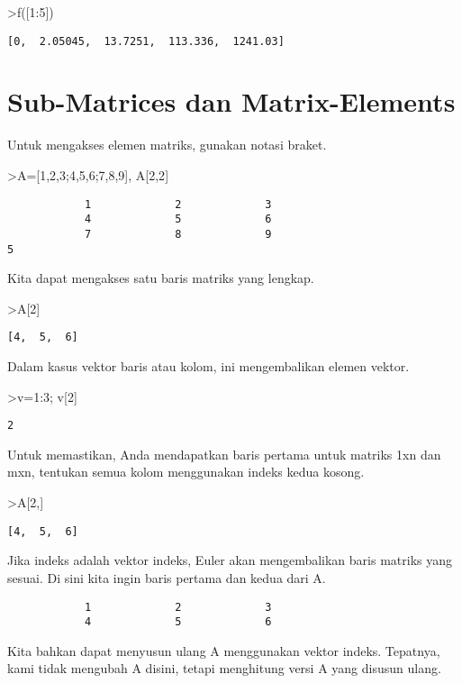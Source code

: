 \documentclass[
]{book}
\begin{document}
\textgreater f({[}1:5{]})

\begin{verbatim}
[0,  2.05045,  13.7251,  113.336,  1241.03]
\end{verbatim}

\chapter{Sub-Matrices dan Matrix-Elements}\label{sub-matrices-dan-matrix-elements}

Untuk mengakses elemen matriks, gunakan notasi braket.

\textgreater A={[}1,2,3;4,5,6;7,8,9{]}, A{[}2,2{]}

\begin{verbatim}
            1             2             3 
            4             5             6 
            7             8             9 
5
\end{verbatim}

Kita dapat mengakses satu baris matriks yang lengkap.

\textgreater A{[}2{]}

\begin{verbatim}
[4,  5,  6]
\end{verbatim}

Dalam kasus vektor baris atau kolom, ini mengembalikan elemen vektor.

\textgreater v=1:3; v{[}2{]}

\begin{verbatim}
2
\end{verbatim}

Untuk memastikan, Anda mendapatkan baris pertama untuk matriks 1xn dan mxn, tentukan semua kolom menggunakan indeks kedua kosong.

\textgreater A{[}2,{]}

\begin{verbatim}
[4,  5,  6]
\end{verbatim}

Jika indeks adalah vektor indeks, Euler akan mengembalikan baris matriks yang sesuai. Di sini kita ingin baris pertama dan kedua dari A.

\begin{verbatim}
            1             2             3 
            4             5             6 
\end{verbatim}

Kita bahkan dapat menyusun ulang A menggunakan vektor indeks. Tepatnya, kami tidak mengubah A disini, tetapi menghitung versi A yang disusun ulang.
\end{document}
